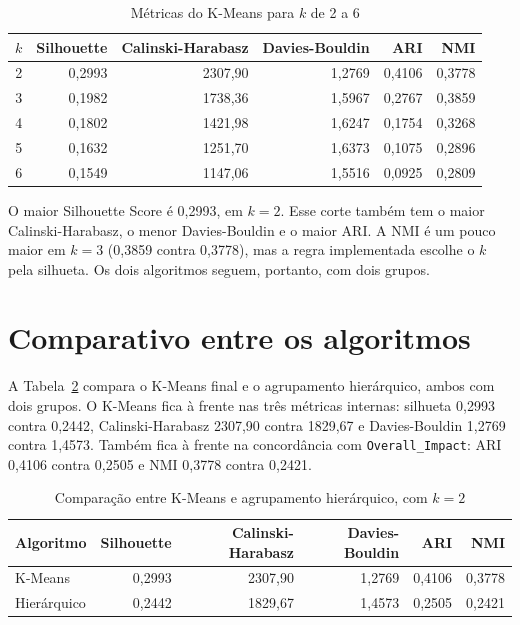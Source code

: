 \documentclass[
  article,
  12pt,
  oneside,
  a4paper,
  english,
  brazil,
  chapter=TITLE,
  section=TITLE,
  subsection=TITLE
]{abntex2}
\begin{document}
\begin{table}[htb]
  \centering
  \caption{Métricas do K-Means para \(k\) de 2 a 6}
  \label{tab:k}
  \small
  \begin{tabular}{rrrrrr}
    \toprule
    \(k\) & Silhouette & Calinski-Harabasz & Davies-Bouldin & ARI & NMI \\
    \midrule
    2 & 0,2993 & 2307,90 & 1,2769 & 0,4106 & 0,3778 \\
    3 & 0,1982 & 1738,36 & 1,5967 & 0,2767 & 0,3859 \\
    4 & 0,1802 & 1421,98 & 1,6247 & 0,1754 & 0,3268 \\
    5 & 0,1632 & 1251,70 & 1,6373 & 0,1075 & 0,2896 \\
    6 & 0,1549 & 1147,06 & 1,5516 & 0,0925 & 0,2809 \\
    \bottomrule
  \end{tabular}
\end{table}

O maior Silhouette Score é 0,2993, em \(k = 2\). Esse corte também tem o maior Calinski-Harabasz, o menor Davies-Bouldin e o maior ARI. A NMI é um pouco maior em \(k = 3\) (0,3859 contra 0,3778), mas a regra implementada escolhe o \(k\) pela silhueta. Os dois algoritmos seguem, portanto, com dois grupos.

\section{Comparativo entre os algoritmos}

A Tabela~\ref{tab:algoritmos} compara o K-Means final e o agrupamento hierárquico, ambos com dois grupos. O K-Means fica à frente nas três métricas internas: silhueta 0,2993 contra 0,2442, Calinski-Harabasz 2307,90 contra 1829,67 e Davies-Bouldin 1,2769 contra 1,4573. Também fica à frente na concordância com \texttt{Overall\_Impact}: ARI 0,4106 contra 0,2505 e NMI 0,3778 contra 0,2421.

\begin{table}[htb]
  \centering
  \caption{Comparação entre K-Means e agrupamento hierárquico, com \(k = 2\)}
  \label{tab:algoritmos}
  \small
  \begin{tabular}{lrrrrr}
    \toprule
    Algoritmo & Silhouette & Calinski-Harabasz & Davies-Bouldin & ARI & NMI \\
    \midrule
    K-Means & 0,2993 & 2307,90 & 1,2769 & 0,4106 & 0,3778 \\
    Hierárquico & 0,2442 & 1829,67 & 1,4573 & 0,2505 & 0,2421 \\
    \bottomrule
  \end{tabular}
\end{table}
\end{document}
